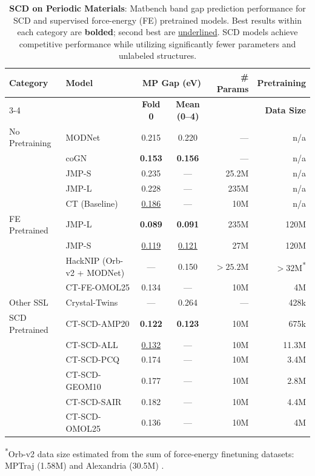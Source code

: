 \begin{table}[t]
\centering
\caption{\textbf{SCD on Periodic Materials}: Matbench band gap prediction performance for SCD and supervised force-energy (FE) pretrained models. Best results within each category are \textbf{bolded}; second best are \underline{underlined}. SCD models achieve competitive performance while utilizing significantly fewer parameters and unlabeled structures.}
\label{tab:mpgap_full}
\small
\begin{tabular*}{\textwidth}{@{\extracolsep{\fill}}l l c c r r}
\toprule
\textbf{Category} & \textbf{Model} & \multicolumn{2}{c}{\textbf{MP Gap (eV)}} & \textbf{\# Params} & \textbf{Pretraining} \\
\cmidrule(lr){3-4}
& & \textbf{Fold 0} & \textbf{Mean (0--4)} & & \textbf{Data Size} \\
\midrule
No Pretraining & MODNet \cite{MODNet_DeBreuck2021} & 0.215 & 0.220 & --- & n/a \\ 
 & coGN \cite{CoGN_ruff2023} & \textbf{0.153} & \textbf{0.156} & --- & n/a \\ 
 & JMP-S \cite{JMP_Shoghi2023} & 0.235 & --- & 25.2M & n/a \\ 
 & JMP-L \cite{JMP_Shoghi2023} & 0.228 & --- & 235M & n/a \\ 
 & CT (Baseline) & \underline{0.186} & --- & 10M & n/a \\
\midrule
FE Pretrained & JMP-L \cite{JMP_Shoghi2023} & \textbf{0.089} & \textbf{0.091} & 235M & 120M \\ 
 & JMP-S \cite{JMP_Shoghi2023} & \underline{0.119} & \underline{0.121} & 27M & 120M \\
 & HackNIP (Orb-v2 + MODNet) \cite{HackNIP_kim2025} & --- & 0.150 & $>25.2$M & $>32$M\textsuperscript{*} \\
 & CT-FE-OMOL25 & 0.134 & --- & 10M & 4M \\

\midrule
Other SSL & Crystal-Twins \cite{xtal_twins} & --- &  0.264 & --- & 428k \\

\midrule
SCD Pretrained & CT-SCD-AMP20 & \textbf{0.122} & \textbf{0.123} & 10M & 675k \\
 & CT-SCD-ALL & \underline{0.132} & --- & 10M & 11.3M \\
 & CT-SCD-PCQ & 0.174 & --- & 10M & 3.4M \\
 & CT-SCD-GEOM10 & 0.177 & --- & 10M & 2.8M \\
 & CT-SCD-SAIR & 0.182 & --- & 10M & 4.4M \\
 & CT-SCD-OMOL25 & 0.136 & --- & 10M & 4M \\
\bottomrule
\end{tabular*}
\vspace{0.25em}
\flushleft\footnotesize \textsuperscript{*}Orb-v2 data size estimated from the sum of force-energy finetuning datasets: MPTraj (1.58M) and Alexandria (30.5M) \cite{HackNIP_kim2025}.
\end{table}